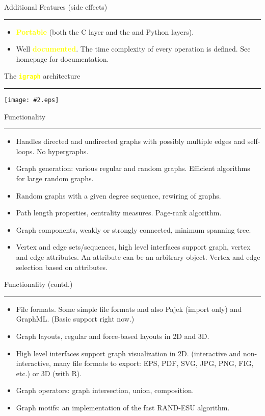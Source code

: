 \documentclass[landscape]{foils}
\newcommand{\figfigure}[2]{%
  \begin{psfrags}%
  
  \texttt{[image: \#2.eps]}%
  \end{psfrags}%
}
\newcommand{\stitle}[1]{{\color{yellow}\centering\Large #1\par\vspace*{10pt}\hrule}}
\renewcommand{\emph}[1]{\textcolor{yellow}{\bf #1}}
\newcommand{\igraph}{\texttt{\emph{igraph}}\xspace}
\begin{document}
\stitle{Additional Features (side effects)} 

\begin{itemize}
\item \emph{Portable} (both the C layer and the and Python
  layers). \pause
\item Well \emph{documented}. The time complexity of every operation is
  defined. See homepage for documentation.
\end{itemize}

\newpage
\stitle{The \igraph architecture}
\begin{center}
\color{black}
\figfigure{.7\textwidth}{arch}
\end{center}

\newpage
\stitle{Functionality}

\begin{itemize}
\item Handles directed and undirected graphs with possibly multiple
  edges and self-loops. No hypergraphs. \pause
\item Graph generation: various regular and random graphs. Efficient
  algorithms for large random graphs. \pause
\item Random graphs with a given degree sequence, rewiring of graphs.\pause
\item Path length properties, centrality measures. Page-rank
  algorithm. \pause
\item Graph components, weakly or strongly connected, minimum spanning
  tree. \pause
\item Vertex and edge sets/sequences, high level interfaces support
  graph, vertex and edge attributes. An attribute can be an arbitrary
  object. Vertex and edge selection based on attributes. 
\end{itemize}

\newpage
\stitle{Functionality (contd.)}
\begin{itemize}
\item File formats. Some simple file formats and also Pajek (import
  only) and GraphML. (Basic support right now.) \pause
\item Graph layouts, regular and force-based layouts in 2D and 3D. \pause
\item High level interfaces support graph visualization in 2D. 
  (interactive and non-interactive, many file formats to export: EPS,
  PDF, SVG, JPG, PNG, FIG, etc.) or 3D
  (with R). \pause
\item Graph operators: graph intersection, union, composition. \pause
\item Graph motifs: an implementation of the fast RAND-ESU algorithm.
\end{itemize}
\end{document}
